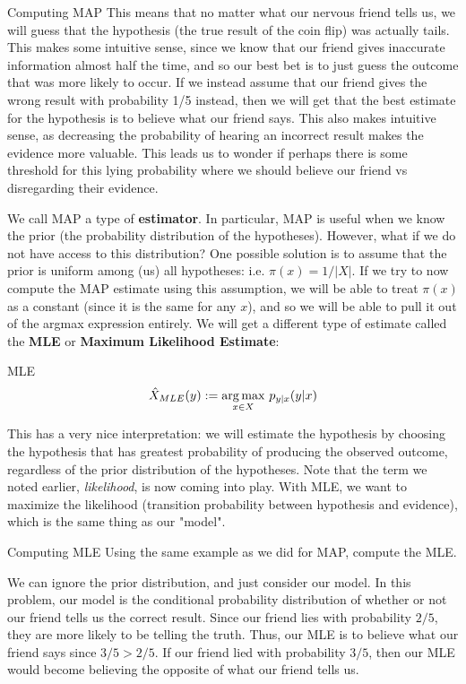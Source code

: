 \begin{exmp}{Computing MAP}{}
This means that no matter what our nervous friend tells us, we will guess that the hypothesis (the true result of the coin flip) was actually tails. This makes some intuitive sense, since we know that our friend gives inaccurate information almost half the time, and so our best bet is to just guess the outcome that was more likely to occur. If we instead assume that our friend gives the wrong result with probability 1/5 instead, then we will get that the best estimate for the hypothesis is to believe what our friend says. This also makes intuitive sense, as decreasing the probability of hearing an incorrect result makes the evidence more valuable. This leads us to wonder if perhaps there is some threshold for this lying probability where we should believe our friend vs disregarding their evidence.


\end{exmp}


We call MAP a type of \textbf{estimator}. In particular, MAP is useful when we know the prior (the probability distribution of the hypotheses). However, what if we do not have access to this distribution? One possible solution is to assume that the prior is uniform among (us) all hypotheses: i.e. \(\pi(x) = 1/|X|\). If we try to now compute the MAP estimate using this assumption, we will be able to treat \(\pi(x)\) as a constant (since it is the same for any \(x\)), and so we will be able to pull it out of the argmax expression entirely. We will get a different type of estimate called the \textbf{MLE} or \textbf{Maximum Likelihood Estimate}:
\begin{defn}{MLE}{}
\begin{equation*}
  {\hat{X}_{MLE}} (y) := \underset{x \in X}{\operatorname*{arg\,max}}\ p_{y|x}(y|x)
\end{equation*}
\end{defn}

This has a very nice interpretation: we will estimate the hypothesis by choosing the hypothesis that has greatest probability of producing the observed outcome, regardless of the prior distribution of the hypotheses. Note that the term we noted earlier, \textit{likelihood}, is now coming into play. With MLE, we want to maximize the likelihood (transition probability between hypothesis and evidence), which is the same thing as our "model".

\begin{exmp}{Computing MLE}{}
Using the same example as we did for MAP, compute the MLE. \newline 

We can ignore the prior distribution, and just consider our model. In this problem, our model is the conditional probability distribution of whether or not our friend tells us the correct result. Since our friend lies with probability \(2/5\), they are more likely to be telling the truth. Thus, our MLE is to believe what our friend says since \(3/5 > 2/5\). If our friend lied with probability \(3/5\), then our MLE would become believing the opposite of what our friend tells us.
\end{exmp}

